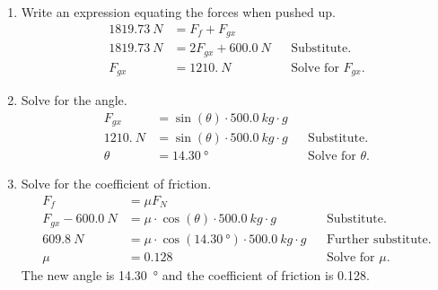 \documentclass[letterpaper, 12pt]{report}
\begin{document}
\begin{enumerate}
\begin{enumerate}
        \item Write an expression equating the forces when pushed up.
        \begin{align}
            \SI{1819.73}{N} &= F_f + F_{gx} && \\
                \SI{1819.73}{N} &= 2F_{gx} + \SI{600.0}{N} && \text{Substitute.} \\
                F_{gx} &= \SI{1210.}{N} && \text{Solve for } F_{gx} \text{.}
        \end{align}
        \item Solve for the angle.
        \begin{align}
            F_{gx} &= \sin(\theta) \cdot \SI{500.0}{kg} \cdot g \\
            \SI{1210.}{N} &= \sin(\theta) \cdot \SI{500.0}{kg} \cdot g && \text{Substitute.} \\
            \theta &= \SI{14.30}{\degree} && \text{Solve for } \theta \text{.}
        \end{align}
        \item Solve for the coefficient of friction.
        \begin{align}
            F_f &= \mu F_N && \\
            F_{gx} - \SI{600.0}{N} &= \mu \cdot \cos(\theta) \cdot \SI{500.0}{kg} \cdot g && \text{Substitute.} \\
            \SI{609.8}{N} &= \mu \cdot \cos(\SI{14.30}{\degree}) \cdot \SI{500.0}{kg} \cdot g && \text{Further substitute.} \\
            \mu &= 0.128 && \text{Solve for } \mu \text{.}
        \end{align}
        The new angle is \SI{14.30}{\degree} and the coefficient of friction is 0.128.
    \end{enumerate}
\end{enumerate}
\end{document}
